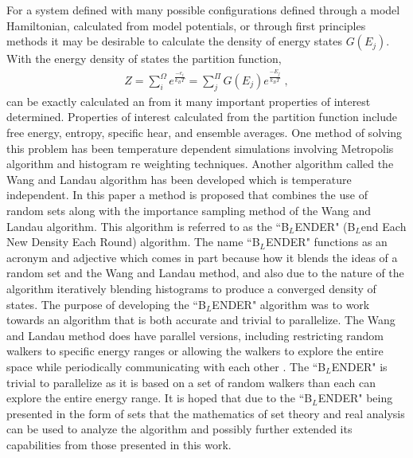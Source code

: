 \documentclass[twocolumn]{article}
\begin{document}
For a system defined with many possible configurations defined through a model Hamiltonian, calculated from model potentials, or through first principles methods it may be desirable to calculate the density of energy states $G(E_j)$. With the energy density of states the partition function,
\begin{equation}
\begin{split}
Z = \sum_{i}^{\Omega}e^{\frac{-e_i}{k_B T} }= \sum_{j}^{\Pi}G(E_j)e^{\frac{-E_j}{k_BT}} \;,
\end{split}
\end{equation}
 can be exactly calculated an from it many important properties of interest determined. Properties of interest calculated from the partition function include  free energy, entropy, specific hear, and ensemble averages. One method of solving this problem has been temperature dependent simulations involving  Metropolis algorithm and histogram re weighting techniques\cite{landau_MC_simulations}.  Another algorithm called the  Wang and Landau algorithm\cite{WL_phys_rev_lett} has been developed which is temperature independent.  In this paper a method is proposed that combines the use of random sets along with the importance sampling method of the Wang and Landau algorithm. This algorithm is referred to as the ``B$_{L}$ENDER" (B$_{L}$end Each New Density Each Round) algorithm. The name ``B$_{L}$ENDER" functions as an acronym and adjective which comes in part because how it blends the ideas of a random set and the Wang and Landau method, and also due to the nature of the algorithm iteratively blending histograms to produce a converged density of states. The purpose of developing the ``B$_{L}$ENDER" algorithm was to work towards an algorithm that is both accurate and trivial  to parallelize. The Wang and Landau method does have parallel versions, including  restricting random walkers to specific energy ranges or allowing the walkers to explore the entire space while periodically communicating with each other \cite{MP_Wang_Landau,P_imp_Wang_Landau, Hframe_Wang_Landau}. The ``B$_{L}$ENDER" is trivial to parallelize as it is based on a set of random walkers than each can explore the entire energy range. It is hoped that due to the ``B$_{L}$ENDER" being presented in the form of sets that the mathematics of set theory and real analysis can be used to analyze the algorithm and possibly further extended its capabilities from those presented in this work. 
\end{document}
